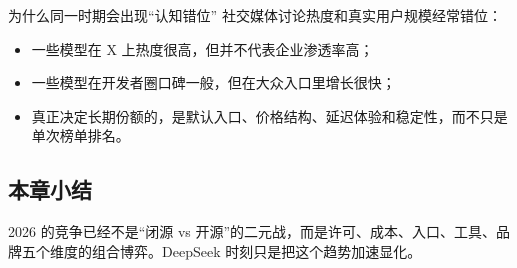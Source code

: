 \begin{knowledgebox}{为什么同一时期会出现“认知错位”}
社交媒体讨论热度和真实用户规模经常错位：
\begin{itemize}[leftmargin=1.5em]
    \item 一些模型在 X 上热度很高，但并不代表企业渗透率高；
    \item 一些模型在开发者圈口碑一般，但在大众入口里增长很快；
    \item 真正决定长期份额的，是默认入口、价格结构、延迟体验和稳定性，而不只是单次榜单排名。
\end{itemize}
\end{knowledgebox}

\subsection{本章小结}

2026 的竞争已经不是“闭源 vs 开源”的二元战，而是许可、成本、入口、工具、品牌五个维度的组合博弈。DeepSeek 时刻只是把这个趋势加速显化。

